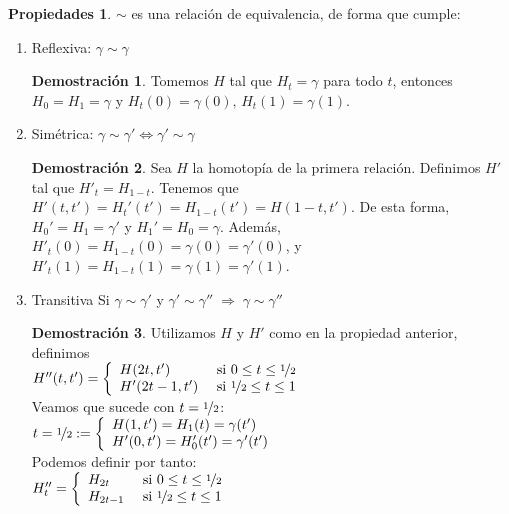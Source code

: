 \documentclass[12pt,twoside]{report}
\theoremstyle{azul}
\theoremstyle{azul2}
\theoremstyle{plain}
\theoremstyle{definition}
\newtheorem*{propi}{Propiedades}
\newtheorem*{dem}{Demostración}
\theoremstyle{remark}
\begin{document}
\begin{propi}
$\sim$ es una relación de equivalencia, de forma que cumple:
\vspace{-3mm}\begin{enumerate}
    \item Reflexiva: $\gamma \sim \gamma$ 
    \begin{dem}
    Tomemos $H$ tal que $H_t = \gamma$ para todo $t$, entonces $H_0 = H_1 = \gamma$ y $H_t(0) = \gamma(0),\,H_t(1) = \gamma(1)$.
    \end{dem}
    \item Sim{\'e}trica: $\gamma \sim \gamma' \Leftrightarrow \gamma' \sim \gamma$ 
    \begin{dem}
    Sea $H$ la homotopía de la primera relación. Definimos $H'$ tal que $H'_t=H_{1-t}$. Tenemos que $H'(t,t')=H_t'(t')=H_{1-t}(t')=H(1-t,t')$. De esta forma, $H_0'=H_1=\gamma'$ y $H_1'=H_0=\gamma$. Además, $H'_t(0) = H_{1-t}(0) = \gamma(0) = \gamma'(0)$, y $H'_t(1) = H_{1-t}(1) = \gamma(1) = \gamma'(1)$.
    \end{dem}
    \item Transitiva Si $\gamma \sim \gamma'$ y $\gamma' \sim \gamma'' \; \Rightarrow \; \gamma \sim \gamma'' $
    \begin{dem}
    Utilizamos $H$ y $H'$ como en la propiedad anterior, definimos \\ \vspace{3mm} \hspace{5mm} $H''(t,t')=\left\{ \begin{array}{ll}
         H(2t,t') & \text{ si } 0 \leq t \leq \nicefrac{1}{2}  \\
         H'(2t-1,t') & \text{ si } \nicefrac{1}{2} \leq t \leq 1 
    \end{array} \right.$\\ \vspace{2mm}
    Veamos que sucede con $t=\nicefrac{1}{2}$:\\ \vspace{2mm}
    \hspace{5mm} $t=\nicefrac{1}{2}:=\left\{ \begin{array}{l}
        H(1,t')=H_1(t)=\gamma(t')  \\
        H'(0,t')=H_0'(t')=\gamma'(t') 
    \end{array} \right.$    \\ \vspace{2mm}
    Podemos definir por tanto: \\ \vspace{2mm}
    \hspace{5mm}  $H''_t = \left\{ \begin{array}{ll}
        H_{2t}  & \text{ si } 0 \leq t \leq \nicefrac{1}{2} \\
        H_{2t-1}& \text{ si } \nicefrac{1}{2} \leq t \leq 1
    \end{array} \right.$
    \end{dem} 
\end{enumerate}
\end{propi}
\end{document}
